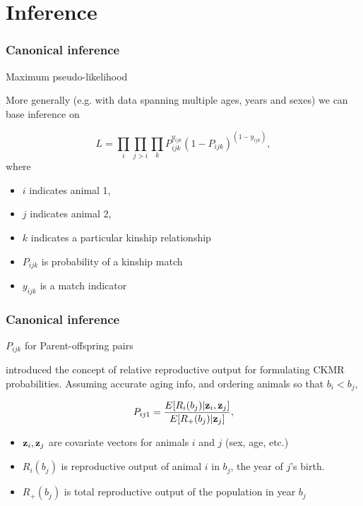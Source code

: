 \documentclass[serif,mathserif]{beamer}
\begin{document}
\section{Inference} %
\begin{frame}
\frametitle{Canonical inference}
\textcolor{noaaturq}{Maximum pseudo-likelihood \citep{BravingtonEtAl2016}}

More generally (e.g. with data spanning multiple ages, years and sexes) we can base inference on

 \begin{equation*}
     L = \prod_i \prod_{j>i} \prod_k P_{ijk}^{y_{ijk}} (1-P_{ijk})^{(1-y_{ijk})},
     \label{eq:likelihood}
 \end{equation*}
where
\begin{itemize}
  \item $i$ indicates animal 1,
  \item $j$ indicates animal 2,
  \item $k$ indicates a particular kinship relationship
  \item $P_{ijk}$ is probability of a kinship match
  \item $y_{ijk}$ is a match indicator
\end{itemize}
\end{frame}

\begin{frame}
  \frametitle{Canonical inference}
  \textcolor{noaaturq}{$P_{ijk}$ for Parent-offspring pairs}

  \vspace{0.5cm}

  \citet{BravingtonEtAl2016} introduced the concept of relative reproductive output for formulating CKMR probabilities.  Assuming accurate aging info, and ordering animals so that $b_i<b_j$,

  \begin{equation*}
   P_{ij1} = \frac{E[R_i(b_j)|{\bf z}_i,{\bf z}_j]}{E[R_+(b_j)|{\bf z}_j]},
  \end{equation*}
  \begin{itemize}
    \item ${\bf z}_i,{\bf z}_j$ are covariate vectors for animals $i$ and $j$ (sex, age, etc.)
    \item $R_i(b_j)$ is reproductive output of animal $i$ in $b_j$, the year of $j$'s birth.
    \item $R_+(b_j)$ is total reproductive output of the population in year $b_j$
  \end{itemize}
\end{frame}
\end{document}
